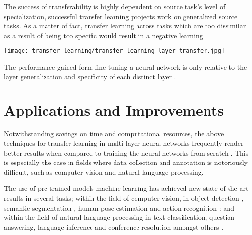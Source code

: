 The success of transferability is highly dependent on source task's level of specialization, successful transfer learning projects work on generalized source tasks. As a matter of fact, transfer learning across tasks which are too dissimilar as a result of being too specific would result in a negative learning \citep{rosenstein2005}.

\begin{marginfigure}
  \texttt{[image: transfer\_learning/transfer\_learning\_layer\_transfer.jpg]}
  \caption{The performance gained form fine-tuning a neural network is only relative to the layer generalization and specificity of each distinct layer \citep{yosinski2014}.}
  \label{fig:transferlearning_pretrained_finetuning}
\end{marginfigure}

\section{Applications and Improvements}\label{sec:transfer-learning-applications-improvements}

Notwithstanding savings on time and computational resources, the above techniques for transfer learning in multi-layer neural networks frequently render better results when compared to training the neural networks from scratch \citep{yosinski2014}. This is especially the case in fields where data collection and annotation is notoriously difficult, such as computer vision and natural language processing. 

The use of pre-trained models machine learning has achieved new state-of-the-art results in several tasks; within the field of computer vision, in object detection \citep{he2017}, semantic segmentation \citep{zhao2016}, human pose estimation \citep{papandreou2017} and action recognition \citep{carreira2017} ; and within the field of natural language processing in text classification, question answering, language inference and conference resolution amongst others \citep{howard2018} \citep{joshi2018}. 

